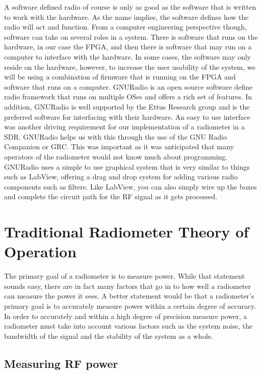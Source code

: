 A software defined radio of course is only as good as the software that is written to work with the hardware.  As the name implies, the software defines how the radio will act and function.  From a computer engineering perspective though, software can take on several roles in a system.  There is software that runs on the hardware, in our case the FPGA, and then there is software that may run on a computer to interface with the hardware.  In some cases, the software may only reside on the hardware, however, to increase the user usability of the system, we will be using a combination of firmware that is running on the FPGA and software that runs on a computer.  GNURadio is an open source software define radio framework that runs on multiple OSes and offers a rich set of features.  In addition, GNURadio is well supported by the Ettus Research group and is the preferred software for interfacing with their hardware.  An easy to use interface was another driving requirement for our implementation of a radiometer in a SDR.  GNURadio helps us with this through the use of the GNU Radio Companion or GRC.  This was important as it was anticipated that many operators of the radiometer would not know much about programming.  GNURadio uses a simple to use graphical system that is very similar to things such as LabView, offering a drag and drop system for adding various radio components such as filters.  Like LabView, you can also simply wire up the boxes and complete the circuit path for the RF signal as it gets processed.

\section{Traditional Radiometer Theory of Operation}

The primary goal of a radiometer is to measure power.  While that statement sounds easy, there are in fact many factors that go in to how well a radiometer can measure the power it sees.  A better statement would be that a radiometer's primary goal is to accurately measure power within a certain degree of accuracy.  In order to accurately and within a high degree of precision measure power, a radiometer must take into account various factors such as the system noise, the bandwidth of the signal and the stability of the system as a whole.  

\subsection{Measuring RF power}

